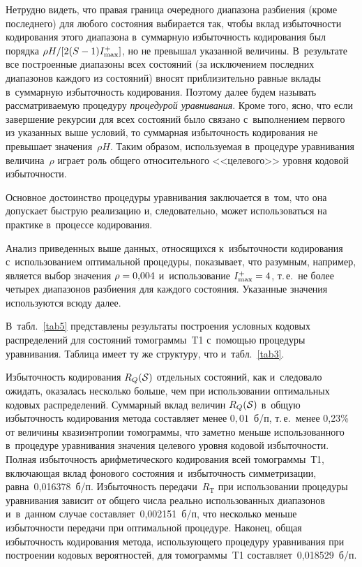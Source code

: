 \begin{multicols}{2}
Нетрудно видеть, что правая граница очередного диапазона разбиения 
(кроме последнего) для любого состояния выбирается так, чтобы вклад 
избыточности кодирования этого диапазона в~суммарную избыточность кодирования 
был порядка $\rho H/[2( S\hm-1) I_{\max}^+]$, но не превышал указанной величины. 
В~результате все построенные диапазоны всех состояний (за исключением последних 
диапазонов каждого из состояний) вносят приблизительно равные вклады в~суммарную 
избыточность кодирования. Поэтому далее будем называть рассматриваемую процедуру 
\textit{процедурой уравнивания}. 
Кроме того, ясно, что если завершение рекурсии для всех состояний было связано 
с~выполнением первого из указанных выше условий, то суммарная избыточность 
кодирования не превышает значения~$\rho H$. Таким образом, используемая в~процедуре 
уравнивания величина~$\rho$ играет роль общего относительного <<целевого>> 
уровня кодовой избыточ\-ности.

Основное достоинство процедуры уравнивания заключается в~том, что она 
допускает быструю реализацию и, следовательно, может использоваться на 
практике в~процессе кодирования.

Анализ приведенных выше данных, относящихся к~избыточности кодирования с~использованием 
оптимальной процедуры, показывает, что разумным, например, является выбор значения\linebreak 
$\rho\hm=0{,}004$ и~использование $I_{\max}^+\hm=4$, т.\,е.\ не более 
четырех диапазонов разбиения для каждого состояния. Указанные значения используются 
всюду далее. 

В~табл.~\ref{tab5} представлены результаты построения условных 
кодовых распределений для состояний томограммы~T1 с~по\-мощью процедуры уравнивания. 
Таблица имеет ту же структуру, что и~табл.~\ref{tab3}.



Избыточность кодирования $R_Q({\cal S})$ отдельных состояний, как и~следовало 
ожидать, оказалась несколько больше, чем при использовании оптимальных 
кодовых распределений. Суммарный вклад величин $R_Q({\cal S})$ в~общую избыточность 
кодирования метода составляет менее $0{,}01$~б/п, т.\,е.\ 
менее 0{,}23\% от величины квазиэнтропии томограммы, что заметно меньше 
использованного в~процедуре уравнивания значения целевого уровня кодовой избыточности. 
Полная избыточность арифметического кодирования всей томограммы~Т1, 
включающая вклад фонового состояния и~избыточность симметризации, 
равна~0,016378~б/п. Избыточность передачи~$R_{\mathrm{T}}$ 
при использовании процедуры уравнивания зависит от общего числа реально использованных 
диапазонов и~в~данном случае составляет~0,002151~б/п, что несколько меньше 
избыточности передачи при оптимальной процедуре. Наконец, общая избыточность 
кодирования метода, использующего процедуру уравнивания при построении 
кодовых вероятностей, для томограммы~T1 со\-став\-ля\-ет~0,018529~б/п.


\end{multicols}
